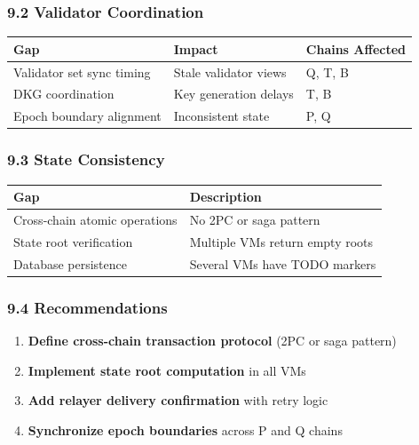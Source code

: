 \documentclass[
]{article}
\newcounter{none} %
\providecommand{\tightlist}{%
  \setlength{\itemsep}{0pt}\setlength{\parskip}{0pt}}
\begin{document}
\subsubsection{9.2 Validator
Coordination}\label{92-validator-coordination}

{\def\LTcaptype{none} %
\begin{longtable}[]{@{}lll@{}}
\toprule\noalign{}
Gap & Impact & Chains Affected \\
\midrule\noalign{}
\endhead
\bottomrule\noalign{}
\endlastfoot
Validator set sync timing & Stale validator views & Q, T, B \\
DKG coordination & Key generation delays & T, B \\
Epoch boundary alignment & Inconsistent state & P, Q \\
\end{longtable}
}

\subsubsection{9.3 State Consistency}\label{93-state-consistency}

{\def\LTcaptype{none} %
\begin{longtable}[]{@{}ll@{}}
\toprule\noalign{}
Gap & Description \\
\midrule\noalign{}
\endhead
\bottomrule\noalign{}
\endlastfoot
Cross-chain atomic operations & No 2PC or saga pattern \\
State root verification & Multiple VMs return empty roots \\
Database persistence & Several VMs have TODO markers \\
\end{longtable}
}

\subsubsection{9.4 Recommendations}\label{94-recommendations}

\begin{enumerate}
\def\labelenumi{\arabic{enumi}.}
\tightlist
\item
  \textbf{Define cross-chain transaction protocol} (2PC or saga pattern)
\item
  \textbf{Implement state root computation} in all VMs
\item
  \textbf{Add relayer delivery confirmation} with retry logic
\item
  \textbf{Synchronize epoch boundaries} across P and Q chains
\end{enumerate}
\end{document}
